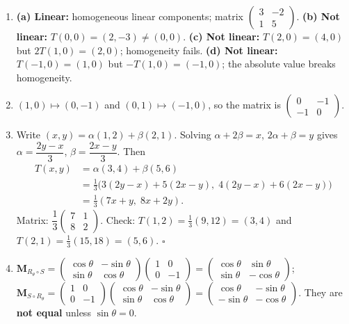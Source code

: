 \documentclass[11pt]{article}
\begin{document}
\begin{corrige}[Exercise 1]
\begin{enumerate}
    \item \textbf{(a) Linear:} homogeneous linear components; matrix $\begin{pmatrix}3&-2\\1&5\end{pmatrix}$.
          \textbf{(b) Not linear:} $T(0,0)=(2,-3)\neq(0,0)$.
          \textbf{(c) Not linear:} $T(2,0)=(4,0)$ but $2T(1,0)=(2,0)$; homogeneity fails.
          \textbf{(d) Not linear:} $T(-1,0)=(1,0)$ but $-T(1,0)=(-1,0)$; the absolute value breaks homogeneity.
    \item $(1,0)\mapsto(0,-1)$ and $(0,1)\mapsto(-1,0)$, so the matrix is $\begin{pmatrix}0&-1\\-1&0\end{pmatrix}$.
    \item Write $(x,y) = \alpha(1,2)+\beta(2,1)$. Solving $\alpha+2\beta=x$, $2\alpha+\beta=y$ gives $\alpha=\dfrac{2y-x}{3}$, $\beta=\dfrac{2x-y}{3}$.
        Then
        \begin{align*}
        T(x,y) &= \alpha(3,4)+\beta(5,6)\\
        &= \tfrac{1}{3}\bigl(3(2y-x)+5(2x-y),\; 4(2y-x)+6(2x-y)\bigr)\\
        &= \tfrac{1}{3}(7x+y,\; 8x+2y).
        \end{align*}
        Matrix: $\dfrac{1}{3}\begin{pmatrix}7&1\\8&2\end{pmatrix}$. Check: $T(1,2)=\tfrac13(9,12)=(3,4)$ and $T(2,1)=\tfrac13(15,18)=(5,6)$. \hfill$\square$
    \item $\mathbf{M}_{R_\theta\circ S} = \begin{pmatrix}\cos\theta&-\sin\theta\\\sin\theta&\cos\theta\end{pmatrix}\begin{pmatrix}1&0\\0&-1\end{pmatrix} = \begin{pmatrix}\cos\theta&\sin\theta\\\sin\theta&-\cos\theta\end{pmatrix}$;
        $\mathbf{M}_{S\circ R_\theta} = \begin{pmatrix}1&0\\0&-1\end{pmatrix}\begin{pmatrix}\cos\theta&-\sin\theta\\\sin\theta&\cos\theta\end{pmatrix} = \begin{pmatrix}\cos\theta&-\sin\theta\\-\sin\theta&-\cos\theta\end{pmatrix}$.
        They are \textbf{not equal} unless $\sin\theta=0$.
\end{enumerate}
\end{corrige}
\end{document}
